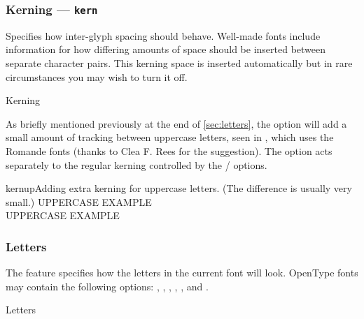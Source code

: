 \documentclass[a4paper]{l3doc}
\begin{document}
\subsubsection{Kerning --- \texttt{kern}}
\label{sec:kerning}

Specifies how inter-glyph spacing should behave.
Well-made fonts include information for how differing
amounts of space should be inserted between separate character pairs.
This kerning space is inserted automatically but in rare
circumstances you may wish to turn it off.

\begin{features}{Kerning}
\end{features}

As briefly mentioned previously at the end of \vref{sec:letters},
the  option will add a small amount of tracking between
uppercase letters, seen in , which uses the Romande
fonts
(thanks to Clea F. Rees for the suggestion).
The  option acts separately to the regular kerning
controlled by the / options.

\begin{Xexample}[firstline=2]{kernup}{Adding extra kerning for uppercase letters. (The difference is usually very small.)}
  \large
   UPPERCASE EXAMPLE \\
   UPPERCASE EXAMPLE
\end{Xexample}


\subsubsection{Letters} \label{sec:letters}
The  feature specifies how the letters in the current font
will look. OpenType fonts may contain the following options:
, , ,
, , and
.

\begin{features}{Letters}
\end{features}
\end{document}
